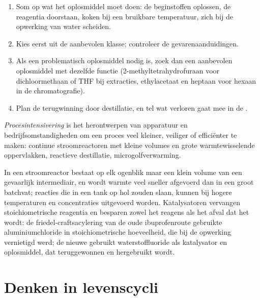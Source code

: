 \begin{method}\label{met:b3:green-industrial:solvent-choice}
\begin{enumerate}
  \item Som op wat het oplosmiddel moet doen: de beginstoffen oplossen,
        de reagentia doorstaan, koken bij een bruikbare temperatuur, zich
        bij de opwerking van water scheiden.
  \item Kies eerst uit de aanbevolen klasse; controleer de
        gevarenaanduidingen.
  \item Als een problematisch oplosmiddel nodig is, zoek dan een
        aanbevolen oplosmiddel met dezelfde functie
        (2-methyltetrahydrofuraan voor dichloormethaan of THF bij
        extracties, ethylacetaat en heptaan voor hexaan in de
        chromatografie).
  \item Plan de terugwinning door destillatie, en tel wat verloren gaat
        mee in de .
\end{enumerate}
\end{method}

\begin{definition}[Procesintensivering]\label{def:b3:green-industrial:intensification}
\emph{Procesintensivering} is het herontwerpen
van apparatuur en bedrijfsomstandigheden om een proces veel kleiner,
veiliger of efficiënter te maken: continue stroomreactoren met kleine
volumes en grote warmtewisselende oppervlakken, reactieve destillatie,
microgolfverwarming.
\end{definition}

In een stroomreactor bestaat op elk ogenblik maar een klein volume van
een gevaarlijk intermediair, en wordt warmte veel sneller afgevoerd dan
in een groot batchvat; reacties die in een tank op hol zouden slaan,
kunnen bij hogere temperaturen en concentraties uitgevoerd worden.
Katalysatoren vervangen stoichiometrische reagentia en besparen zowel het
reagens als het afval dat het wordt: de friedel-craftsacylering van de
oude ibuprofenroute gebruikte aluminiumchloride in stoichiometrische
hoeveelheid, die bij de opwerking vernietigd werd; de nieuwe gebruikt
waterstoffluoride als katalysator en oplosmiddel, dat teruggewonnen en
hergebruikt wordt.

\section{Denken in levenscycli}

